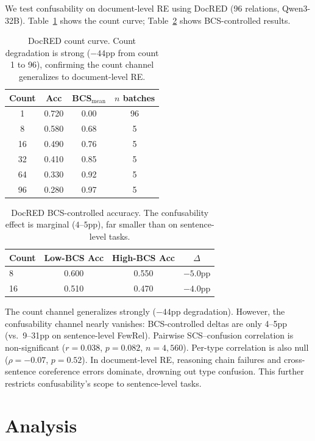 \documentclass[11pt,a4paper]{article}
\begin{document}
We test confusability on document-level RE using DocRED (96 relations, Qwen3-32B). Table~\ref{tab:docred_count} shows the count curve; Table~\ref{tab:docred_bcs} shows BCS-controlled results.

\begin{table}[t]
\centering
\small
\begin{tabular}{cccc}
\toprule
Count & Acc & BCS$_\text{mean}$ & $n$ batches \\
\midrule
1 & 0.720 & 0.00 & 96 \\
8 & 0.580 & 0.68 & 5 \\
16 & 0.490 & 0.76 & 5 \\
32 & 0.410 & 0.85 & 5 \\
64 & 0.330 & 0.92 & 5 \\
96 & 0.280 & 0.97 & 5 \\
\bottomrule
\end{tabular}
\caption{DocRED count curve. Count degradation is strong ($-44$pp from count 1 to 96), confirming the count channel generalizes to document-level RE.}
\label{tab:docred_count}
\end{table}

\begin{table}[t]
\centering
\small
\begin{tabular}{lccc}
\toprule
Count & Low-BCS Acc & High-BCS Acc & $\Delta$ \\
\midrule
8 & 0.600 & 0.550 & $-5.0$pp \\
16 & 0.510 & 0.470 & $-4.0$pp \\
\bottomrule
\end{tabular}
\caption{DocRED BCS-controlled accuracy. The confusability effect is marginal ($4$--$5$pp), far smaller than on sentence-level tasks.}
\label{tab:docred_bcs}
\end{table}

The count channel generalizes strongly ($-44$pp degradation). However, the confusability channel nearly vanishes: BCS-controlled deltas are only 4--5pp (vs.\ 9--31pp on sentence-level FewRel). Pairwise SCS--confusion correlation is non-significant ($r{=}0.038$, $p{=}0.082$, $n{=}4{,}560$). Per-type correlation is also null ($\rho{=}{-}0.07$, $p{=}0.52$). In document-level RE, reasoning chain failures and cross-sentence coreference errors dominate, drowning out type confusion. This further restricts confusability's scope to sentence-level tasks.

\section{Analysis}
\label{sec:analysis}
\end{document}

